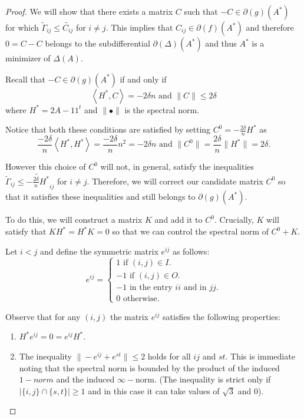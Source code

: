 \documentclass[12pt]{amsart}
\theoremstyle{remark}
\begin{document}
\begin{proof}
We will show that there exists a matrix $C $ such that 
$-C \in \partial(g)(A^*) $ for which $\widetilde{\Gamma}_{ij}\leq \widetilde{C_{ij}}$ for $i\neq j$. This implies that $C_{ij} \in \partial(f)(A^*)$ and therefore $0=C-C$ belongs to the subdifferential $\partial(\Delta)(A^*)$ and thus $A^*$ is a minimizer of $\Delta(A)$.

Recall that $-C \in  \partial(g)(A^*) $ if and only if 
\[
\left \langle H^*,C \right \rangle = -2\delta n \text{ and } \|C\| \leq 2\delta
\]
where $H^* = 2A-11^t$ and $\|\bullet\|$ is the spectral norm.

Notice that both these conditions are satisfied by setting
$C^0 = -\frac{2\delta}{n}H^*$ as
\[
 \frac{-2\delta}{n}\left \langle H^*,H^* \right \rangle =  \frac{-2\delta}{n}n^2 = -2\delta n \text{ and } \|C^0\|= \frac{2\delta}{n}\|H^*\|= 2\delta.
\]

However this choice of $C^0$ will not, in general, satisfy the inequalities $\widetilde{\Gamma}_{ij}\leq \widetilde{-\frac{2\delta}{n} H^*}_{ij}$ for $i\neq j$. 
Therefore, we will correct our candidate matrix $C^0$ so that it satisfies these inequalities and still belongs to $\partial(g)(A^*)$.

To do this, we will construct a matrix $K$ and add it to $C^0$. Crucially, $K$ will satisfy that $KH^* = H^*K = 0$ so that we can control the spectral norm of $C^0+K$.

Let $i<j$ and 
define the symmetric matrix  $e^{ij}$ as follows:
\begin{equation}
e^{ij}=\begin{cases}
1 \text{ if }(i,j) \in I. \\
-1 \text{ if }(i,j) \in O. \\
-1 \text{ in the entry } ii \text{ and in } jj. \\
0 \text{ otherwise}. 
\end{cases}
\end{equation}

Observe that for any $(i,j)$ the matrix $e^{ij}$ satisfies the following  properties:

\begin{enumerate}
\item  $H^*e^{ij}=0=e^{ij}H^*$. 
\item The inequality $\|-e^{ij}+e^{st}\|\leq 2$ holds for all $ij$ and $st$. This is immediate noting that the spectral norm is bounded by the product of the induced $1-norm$ and the induced $\infty-$norm. (The inequality is strict only if $|\{i,j\}\cap\{s,t\}|\geq 1$ and in this case it can take values of $\sqrt{3}$ and $0$).  
\end{enumerate}


\end{proof}
\end{document}
